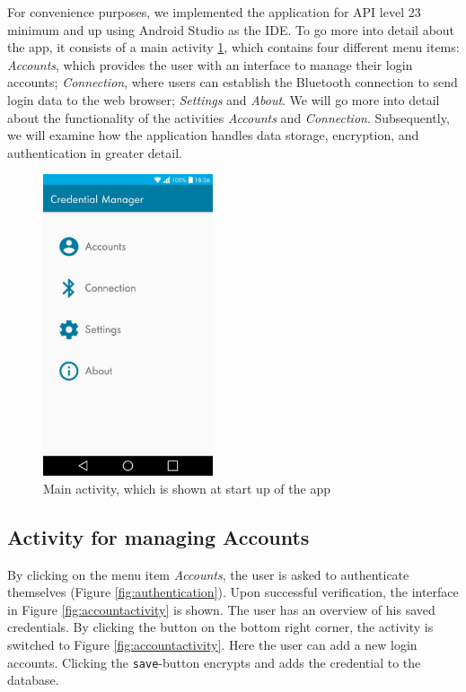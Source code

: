 \noindent For convenience purposes, we implemented the application for API level 23 minimum and up using Android Studio as the IDE. To go more into detail about the app, it consists of a main activity \ref{fig:mainactivity}, which contains four different menu items: \textit{Accounts}, which provides the user with an interface to manage their login accounts; \textit{Connection}, where users can establish the Bluetooth connection to send login data to the web browser; \textit{Settings} and \textit{About}. We will go more into detail about the functionality of the activities \textit{Accounts} and \textit{Connection}. Subsequently, we will examine how the application handles data storage, encryption, and authentication in greater detail.

\begin{figure}[H]
\centering
\includegraphics[width=5cm]{images/MainActivity}
\caption[Main activity]{Main activity, which is shown at start up of the app}
\label{fig:mainactivity}
\end{figure}


\subsection{Activity for managing Accounts}
By clicking on the menu item \textit{Accounts}, the user is asked to authenticate themselves (Figure \ref{fig:authentication}\protect{}). Upon successful verification, the interface in Figure \ref{fig:accountactivity}\protect{} is shown. The user has an overview of his saved credentials. By clicking the button on the bottom right corner, the activity is switched to Figure \ref{fig:accountactivity}\protect{}. Here the user can add a new login accounts. Clicking the \texttt{save}-button encrypts and adds the credential to the database.

